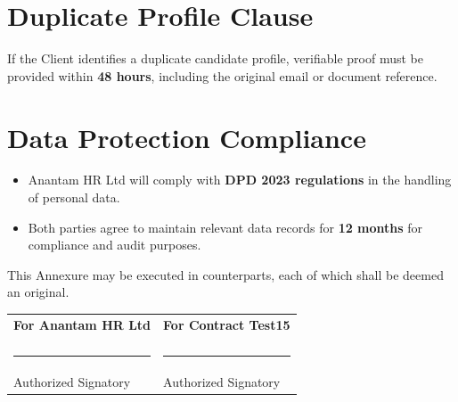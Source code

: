 \documentclass[12pt]{article}
\begin{document}
\section{Duplicate Profile Clause}

If the Client identifies a duplicate candidate profile, verifiable proof must be provided within \textbf{48 hours}, including the original email or document reference.

\section{Data Protection Compliance}

\begin{itemize}
\item Anantam HR Ltd will comply with \textbf{DPD 2023 regulations} in the handling of personal data.

\item Both parties agree to maintain relevant data records for \textbf{12 months} for compliance and audit purposes.
\end{itemize}

This Annexure may be executed in counterparts, each of which shall be deemed an original.

\vspace{1.5cm}

\begin{tabular}{p{7cm} p{7cm}}

\textbf{For Anantam HR Ltd} & \textbf{For Contract Test15} \\

\vspace{2cm} & \vspace{2cm} \\

\rule{6cm}{0.4pt} & \rule{6cm}{0.4pt} \\
Authorized Signatory & Authorized Signatory \\

\end{tabular}
\end{document}
